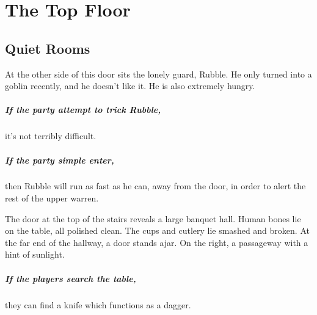 \chapter{The Top Floor}
\epigraph{
  \iftoggle{hardcore}{
    I have township, yet no houses.
    Forests, but no trees.
    Rivers, but no water.
  }{
    Never resting, never still.

    Moving silently from hill to hill.

    It does not walk, run or trot.

    All is cool where it is not.
  }
}{}

\section{Quiet Rooms}
\label{upper}

\begin{multicols}{2}



At the other side of this door sits the lonely guard, Rubble.
He only turned into a goblin recently, and he doesn't like it.
He is also extremely hungry.

\paragraph{If the party attempt to trick Rubble,}
it's not terribly difficult.

\paragraph{If the party simple enter,}
then Rubble will run as fast as he can, away from the door, in order to alert the rest of the upper warren.



\begin{boxtext}

  The door at the top of the stairs reveals a large banquet hall.
  Human bones lie on the table, all polished clean.
  The cups and cutlery lie smashed and broken.
  At the far end of the hallway, a door stands ajar.
  On the right, a passageway with a hint of sunlight.

\end{boxtext}

\paragraph{If the players search the table,}
they can find a knife which functions as a dagger.


\end{multicols}
